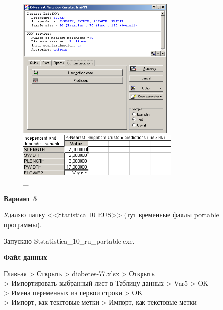 \begin{figure}[!h]
  \centering

  \begin{minipage}{0.49\textwidth}
    \centering

    \includegraphics[height=7cm]
    {inc/ex_30.PNG}

    \caption{\_}

    \label{fig:23}
  \end{minipage}
  \begin{minipage}{0.49\textwidth}
    \centering

    \includegraphics[width=8cm]
    {inc/ex_31.PNG}

    \caption{\_}

    \label{fig:24}
  \end{minipage}
\end{figure}

\newpage

\begin{center}
  \textbf{Вариант 5}
\end{center}

Удаляю папку <<Statistica 10 RUS>> (тут временные файлы portable программы).

Запускаю Ststatistica\_10\_ru\_portable.exe.

\begin{center}
  \textbf{Файл данных}
\end{center}

Главная > Открыть > diabetes-77.xlsx > Открыть \\
> Импортировать выбранный лист в Таблицу данных > Var5 > OK \\
> Имена переменных из первой строки > OK \\
> Импорт, как текстовые метки > Импорт, как текстовые метки

